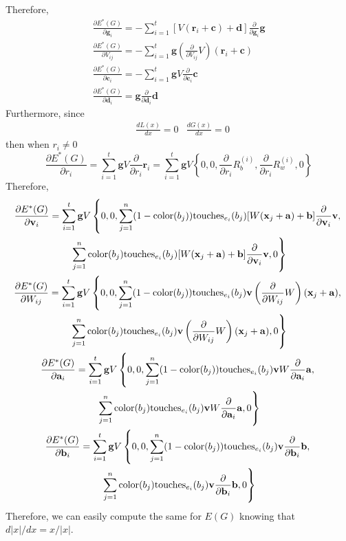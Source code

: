 \documentclass{amsart}
\def\v#1{\mathbf{#1}}
\begin{document}
Therefore,
\begin{gather*}
\frac{ \partial E^*(G) }{ \partial \v{ g }_i }
  = -\sum_{ i = 1 }^t [V(\v{ r }_i + \v{ c }) + \v{ d }] \frac{ \partial }{ \partial \v{ g }_i } \v{ g }\\
\frac{ \partial E^*(G) }{ \partial V_{ i j } }
  = -\sum_{ i = 1 }^t \v{ g } \left(\frac{ \partial }{ \partial V_{ i j } } V\right)(\v{ r }_i + \v{ c })\\
\frac{ \partial E^*(G) }{ \partial \v{ c }_i }
  = - \sum_{ i = 1 }^t \v{ g } V \frac{ \partial }{ \partial \v{ c }_i } \v{ c }\\
\frac{ \partial E^*(G) }{ \partial \v{ d }_i } = \v{ g } \frac{ \partial }{ \partial \v{ d }_i } \v{ d }
\end{gather*}
Furthermore, since
\begin{align*}
&\frac{ d L(x) }{ d x } = 0
&\frac{ d G(x) }{ d x } = 0
\end{align*}
then when $r_i \neq 0$
$$\frac{ \partial E^*(G) }{ \partial r_i }
  = \sum_{ i = 1 }^t \v{ g } V \frac{ \partial }{ \partial r_i } \v{ r }_i
  = \sum_{ i = 1 }^t \v{ g } V
  \left\{ 0, 0, \frac{ \partial }{ \partial r_i } R_b^{ (i) }, \frac{ \partial }{ \partial r_i } R_w^{ (i) }, 0 \right\}$$
Therefore,
\begin{gather*}
\frac{ \partial E^*(G) }{ \partial \v{ v }_i } = \sum_{ i = 1 }^t \v{ g } V
  \left\{ 0, 0, \sum_{ j = 1 }^n (1 - \color{ b_j }) \touches{ e_i }{ b_j } [W(\v{ x }_j + \v{ a }) + \v{ b }]
  \frac{ \partial }{ \partial \v{ v }_i } \v{ v },\right.\\
  \left.\sum_{ j = 1 }^n \color{ b_j } \touches{ e_i }{ b_j } [W(\v{ x }_j + \v{ a }) + \v{ b }]
  \frac{ \partial }{ \partial \v{ v }_i } \v{ v }, 0 \right\}\\
\frac{ \partial E^*(G) }{ \partial W_{ i j } }  = \sum_{ i = 1 }^t \v{ g } V
  \left\{ 0, 0, \sum_{ j = 1 }^n (1 - \color{ b_j }) \touches{ e_i }{ b_j } \v{ v }
  \left(\frac{ \partial }{ \partial W_{ i j } } W\right) (\v{ x }_j + \v{ a }),\right.\\
  \left.\sum_{ j = 1 }^n \color{ b_j } \touches{ e_i }{ b_j } \v{ v }
  \left(\frac{ \partial }{ \partial W_{ i j } } W\right) (\v{ x }_j + \v{ a }), 0 \right\}\\
\frac{ \partial E^*(G) }{ \partial \v{ a }_i } = \sum_{ i = 1 }^t \v{ g } V
  \left\{ 0, 0, \sum_{ j = 1 }^n (1 - \color{ b_j }) \touches{ e_i }{ b_j }
  \v{ v } W \frac{ \partial }{ \partial \v{ a }_i } \v{ a },\right.\\
  \left.\sum_{ j = 1 }^n \color{ b_j } \touches{ e_i }{ b_j }
  \v{ v } W \frac{ \partial }{ \partial \v{ a }_i } \v{ a }, 0 \right\}\\
\frac{ \partial E^*(G) }{ \partial \v{ b }_i } = \sum_{ i = 1 }^t \v{ g } V
  \left\{ 0, 0, \sum_{ j = 1 }^n (1 - \color{ b_j }) \touches{ e_i }{ b_j }
  \v{ v } \frac{ \partial }{ \partial \v{ b }_i } \v{ b },\right.\\
  \left.\sum_{ j = 1 }^n \color{ b_j } \touches{ e_i }{ b_j }
  \v{ v } \frac{ \partial }{ \partial \v{ b }_i } \v{ b }, 0 \right\}
\end{gather*}
Therefore, we can easily compute the same for $E(G)$ knowing that $d |x| / dx = x / |x|$.
\end{document}
